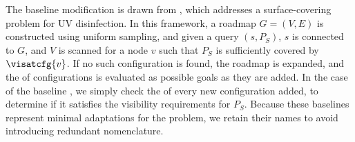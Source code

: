 

 The baseline \prm modification is drawn from \cite{mrph-ocpuvsd-21}, which addresses a surface-covering problem for UV disinfection. In this framework, a roadmap $G=(V,E)$ is constructed using uniform sampling, and given a query $(s,P_S)$, $s$ is connected to $G$, and $V$ is scanned for a node $v$ such that $P_S$ is sufficiently covered by $\visatcfg{v}$. If no such configuration is found, the roadmap is expanded, and the \fov of configurations is evaluated as possible goals as they are added. In the case of the baseline \rrt, we simply check the \fov of every new configuration added, to determine if it satisfies the visibility requirements for $P_S$. Because these baselines represent minimal adaptations for the \tvmp problem, we retain their names to avoid introducing redundant nomenclature. 

